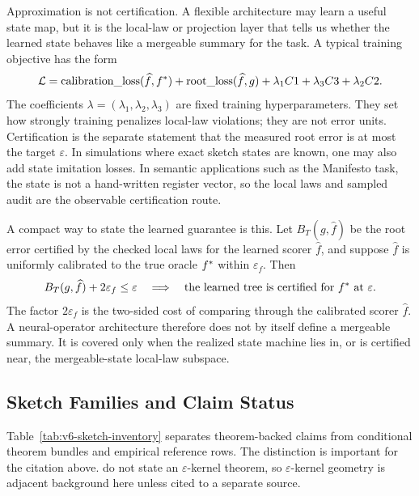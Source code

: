 Approximation is not certification.  A flexible architecture may learn a useful
state map, but it is the local-law or projection layer that tells us whether
the learned state behaves like a mergeable summary for the task.  A typical
training objective has the form
\[
  \mathcal{L}
  =
  \mathrm{calibration\_loss}(\widehat f,f^\ast)
  +\mathrm{root\_loss}(\widehat f,g)
  +\lambda_1 C1+\lambda_3 C3+\lambda_2 C2.
\]
The coefficients \(\lambda=(\lambda_1,\lambda_2,\lambda_3)\) are fixed
training hyperparameters.  They set how strongly training penalizes local-law
violations; they are not error units.  Certification is the separate statement
that the measured root error is at most the target \(\varepsilon\).
In simulations where exact sketch states are known, one may also add state
imitation losses.  In semantic applications such as the Manifesto task, the
state is not a hand-written register vector, so the local laws and sampled
audit are the observable certification route.

A compact way to state the learned guarantee is this.  Let \(B_T(g,\widehat f)\)
be the root error certified by the checked local laws for the learned scorer
\(\widehat f\), and suppose \(\widehat f\) is uniformly calibrated to the true
oracle \(f^\ast\) within \(\varepsilon_f\).  Then
\[
  B_T(g,\widehat f)+2\varepsilon_f\le\varepsilon
  \quad\Longrightarrow\quad
  \text{the learned tree is certified for }f^\ast\text{ at }\varepsilon.
\]
The factor \(2\varepsilon_f\) is the two-sided cost of comparing through the
calibrated scorer \(\widehat f\).  A neural-operator architecture therefore
does not by itself define a mergeable summary.  It is covered only when the
realized state machine lies in, or is certified near, the mergeable-state
local-law subspace.

\subsection{Sketch Families and Claim Status}
\label{app:v6-sketch-inventory}

Table~\ref{tab:v6-sketch-inventory} separates theorem-backed claims from
conditional theorem bundles and empirical reference rows.  The distinction is
important for the citation above.  \citet{Agarwal2013MergeableTODS} do not
state an \(\varepsilon\)-kernel theorem, so \(\varepsilon\)-kernel geometry is
adjacent background here unless cited to a separate source.

